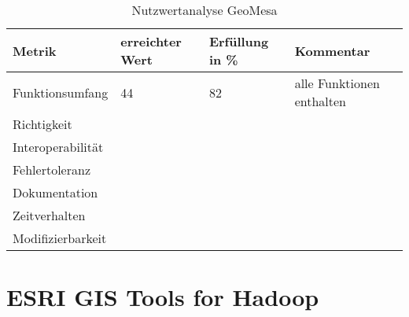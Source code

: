 \begin{table}[htp]
\centering
\small
\begin{tabular}{l|l|l|p{3cm}}
\textbf{Metrik} & \textbf{erreichter Wert} & \textbf{Erfüllung in \%} & \textbf{Kommentar} \\ \hline
Funktionsumfang & 44 & 82 & alle Funktionen enthalten \\ \hline
Richtigkeit &  &  &  \\ \hline
Interoperabilität &  &  &  \\ \hline
Fehlertoleranz &  &  &  \\ \hline
Dokumentation &  &  &  \\ \hline
Zeitverhalten &  &  &  \\ \hline
Modifizierbarkeit &  &  &  \\
\end{tabular}
\caption{Nutzwertanalyse GeoMesa}
\label{table:nutzwertanalyse-geomesa}
\end{table}



\section{ESRI GIS Tools for Hadoop}

